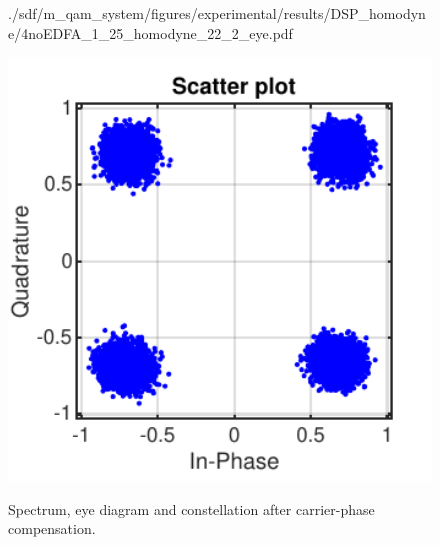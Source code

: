 \begin{figure}[H]
\begin{minipage}{0.30\textwidth}
			{./sdf/m_qam_system/figures/experimental/results/DSP_homodyne/4noEDFA_1_25_homodyne_22_2_eye.pdf}
			\label{fig:1250MBdSpecMF}
		\end{minipage}
		\begin{minipage}{0.30\textwidth}
			\centering
			\includegraphics[width=1\textwidth]
			{./sdf/m_qam_system/figures/experimental/results/DSP_homodyne/4noEDFA_1_25_homodyne_22_2_const.pdf}\\
			\label{fig:1250MBdSpecBefFec}
		\end{minipage}
		\caption{Spectrum, eye diagram and constellation after carrier-phase
		compensation.}
		\label{fig:1250MBMFHm}
	\end{figure}


